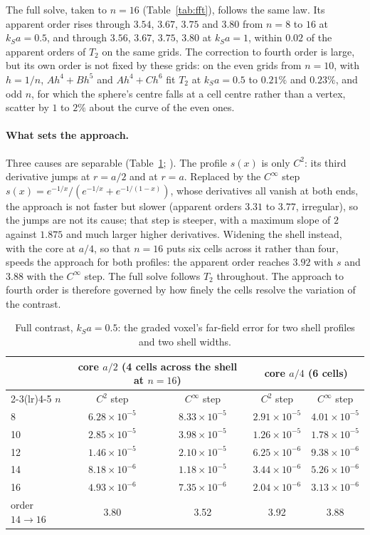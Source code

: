 \documentclass[11pt,a4paper]{article}
\begin{document}
The full solve, taken to $n=16$ (Table~\ref{tab:fft}), follows the same law. Its apparent order rises
through $3.54$, $3.67$, $3.75$ and $3.80$ from $n=8$ to $16$ at $k_Sa=0.5$, and through $3.56$, $3.67$,
$3.75$, $3.80$ at $k_Sa=1$, within $0.02$ of the apparent orders of $T_2$ on the same grids. The
correction to fourth order is large, but its own order is not fixed by these grids: on the even grids
from $n=10$, with $h=1/n$, $Ah^4+Bh^5$ and $Ah^4+Ch^6$ fit $T_2$ at $k_Sa=0.5$ to $0.21\%$ and $0.23\%$,
and odd $n$, for which the sphere's centre falls at a cell centre rather than a vertex, scatter by $1$ to
$2\%$ about the curve of the even ones.

\paragraph{What sets the approach.} Three causes are separable (Table~\ref{tab:resolution};
). The profile $s(x)$ is only $C^2$: its third
derivative jumps at $r=a/2$ and at $r=a$. Replaced by the $C^\infty$ step
$s(x)=e^{-1/x}/(e^{-1/x}+e^{-1/(1-x)})$, whose derivatives all vanish at both ends, the approach is not
faster but slower (apparent orders $3.31$ to $3.77$, irregular), so the jumps are not its cause; that step
is steeper, with a maximum slope of $2$ against $1.875$ and much larger higher derivatives. Widening the
shell instead, with the core at $a/4$, so that $n=16$ puts six cells across it rather than four, speeds
the approach for both profiles: the apparent order reaches $3.92$ with $s$ and $3.88$ with the $C^\infty$
step. The full solve follows $T_2$ throughout. The approach to fourth order is therefore governed by how
finely the cells resolve the variation of the contrast.

\begin{table}[ht]
\centering\small
\setlength{\tabcolsep}{6pt}
\begin{tabular}{@{}lcccc@{}}
\toprule
 & \multicolumn{2}{c}{core $a/2$ (4 cells across the shell at $n=16$)} & \multicolumn{2}{c}{core $a/4$ (6 cells)} \\
\cmidrule(lr){2-3}\cmidrule(lr){4-5}
$n$ & $C^2$ step & $C^\infty$ step & $C^2$ step & $C^\infty$ step \\
\midrule
8 & $6.28\times10^{-5}$ & $8.33\times10^{-5}$ & $2.91\times10^{-5}$ & $4.01\times10^{-5}$ \\
10 & $2.85\times10^{-5}$ & $3.98\times10^{-5}$ & $1.26\times10^{-5}$ & $1.78\times10^{-5}$ \\
12 & $1.46\times10^{-5}$ & $2.10\times10^{-5}$ & $6.25\times10^{-6}$ & $9.38\times10^{-6}$ \\
14 & $8.18\times10^{-6}$ & $1.18\times10^{-5}$ & $3.44\times10^{-6}$ & $5.26\times10^{-6}$ \\
16 & $4.93\times10^{-6}$ & $7.35\times10^{-6}$ & $2.04\times10^{-6}$ & $3.13\times10^{-6}$ \\
order $14\to16$ & 3.80 & 3.52 & 3.92 & 3.88 \\
\bottomrule
\end{tabular}
\caption{Full contrast, $k_Sa=0.5$: the graded voxel's far-field error for two shell profiles and two
shell widths.}\label{tab:resolution}
\end{table}
\end{document}
